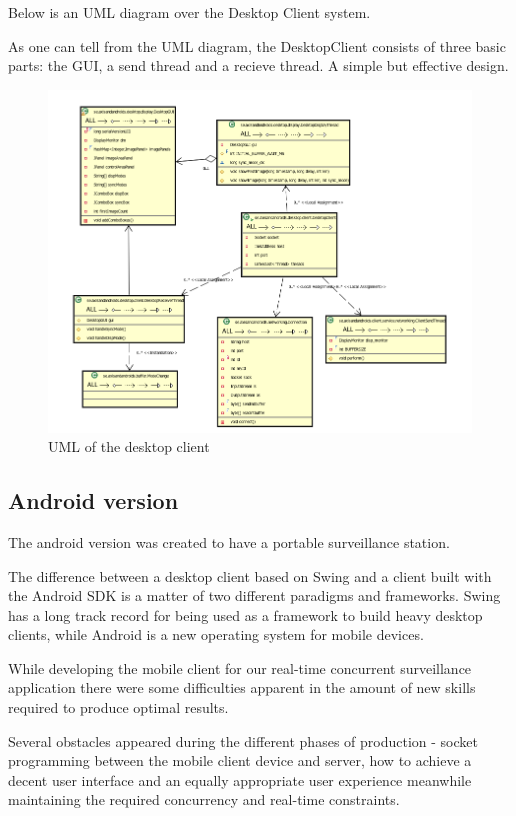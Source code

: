 \documentclass[8pt,titlepage]{article}
\begin{document}
Below is an UML diagram over the Desktop Client system. 

As one can tell from the UML diagram, the DesktopClient consists of three basic parts: the GUI, a send thread and a recieve thread. A simple but effective design.

\clearpage
\begin{figure}[h!]
\includegraphics[width=1.7\textwidth]{../uml/desktop-client.png}
\caption{UML of the desktop client}
\end{figure}

\clearpage
\subsection{Android version}
The android version was created to have a portable surveillance station.

The difference between a desktop client based on Swing and a client built with the Android SDK is a matter of two different paradigms and frameworks. Swing has a long track record for being used as a framework to build heavy desktop clients, while Android is a new operating system for mobile devices. 

While developing the mobile client for our real-time concurrent surveillance application there were some difficulties apparent in the amount of new skills required to produce optimal results. 

Several obstacles appeared during the different phases of production - socket programming between the mobile client device and server, how to achieve a decent user interface and an equally appropriate user experience meanwhile maintaining the required concurrency and real-time constraints. 
\end{document}
